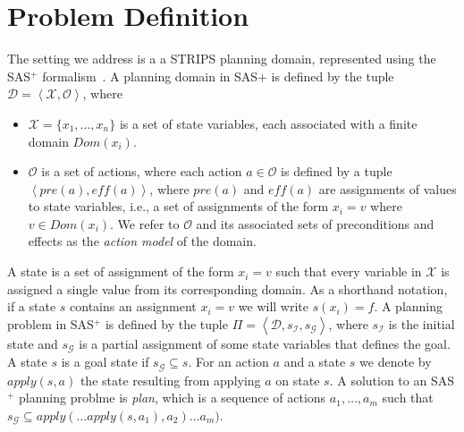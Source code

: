 \documentclass{article}
\newcommand{\tuple}[1]{\ensuremath{\left \langle #1 \right \rangle }}
\newcommand{\SAS}{SAS$^+$}
\newcommand{\eff}{\textit{eff}}
\newcommand{\pre}{\textit{pre}}
\begin{document}
	
	
	
	
	\section{Problem Definition}
	The setting we address is a a STRIPS planning domain, represented 
	using the \SAS{} formalism~\cite{backstrom1995complexity}. 
	A planning domain in SAS$+$ is defined by the tuple $\mathcal{D}=\tuple{\mathcal{X}, \mathcal{O}}$, where 
	\begin{itemize}
		\item $\mathcal{X}=\{x_1,\ldots, x_n\}$ is a set of state variables, each associated with a finite domain $Dom(x_i)$. 
		\item $\mathcal{O}$ is a set of actions, where each action $a\in \mathcal{O}$      is defined by a tuple $\tuple{\pre(a), \eff(a)}$, where $\pre(a)$ and $\eff(a)$ are assignments of values to state variables, i.e., a set of assignments of the form $x_i=v$ where $v\in Dom(x_i)$. We refer to $\mathcal{O}$ and its associated sets of preconditions and effects as the {\em action model} of the domain.
	\end{itemize}
	
	A state is a set of assignment of the form $x_i=v$ 
	such that every variable in $\mathcal{X}$ is assigned a single value from its corresponding domain. As a shorthand notation, if a state $s$ contains an assignment $x_i=v$ we will write $s(x_i)=f$. A planning problem in \SAS{} is defined by the tuple $\Pi=\tuple{\mathcal{D},s_\mathcal{I}, s_\mathcal{G}}$, where 
	$s_\mathcal{I}$ is the initial state and $s_\mathcal{G}$ 
	is a partial assignment of some state variables that defines the goal. A state $s$ is a goal state if $s_\mathcal{G}\subseteq s$. 
	For an action $a$ and a state $s$ we denote by $apply(s,a)$ the state
	resulting from applying $a$ on state $s$. 
	A solution to an \SAS{} planning problme is {\em plan}, 
	which is a sequence of actions $a_1,\ldots,a_m$ such that  $s_\mathcal{G}\subseteq apply(\ldots apply(s,a_1), a_2)\ldots a_m)$. 
	
\end{document}
